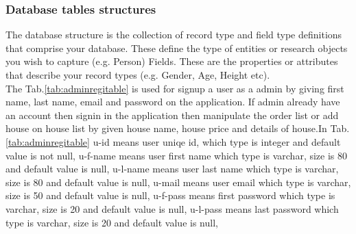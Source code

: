 \documentclass[12pt,a4paper]{article}
\newcommand\tab[1][.7cm]{\hspace*{#1}}
\begin{document}
	


	\subsubsection{Database tables structures}
	\tab The database structure is the collection of record type and field type definitions that comprise your database. These define the type of entities or research objects you wish to capture (e.g. Person) Fields. These are the properties or attributes that describe your record types (e.g. Gender, Age, Height etc).\\
		\tab The Tab.\ref{tab:adminregitable} is used for signup a user as a admin by giving first name, last name, email and password on the application. If admin already have an account then signin in the application then manipulate the order list or add house on house list by given house name, house price and details of house.In Tab.\ref{tab:adminregitable} u-id means user uniqe id, which type is integer and default value is not null, u-f-name means user first name which type is varchar, size is 80 and default value is null, u-l-name means user last name which type is varchar, size is 80 and default value is null, u-mail means user email which type is varchar, size is 50 and default value is null, u-f-pass means first password which type is varchar, size is 20 and default value is null, u-l-pass means last password which type is varchar, size is 20 and default value is null, 
\end{document}
